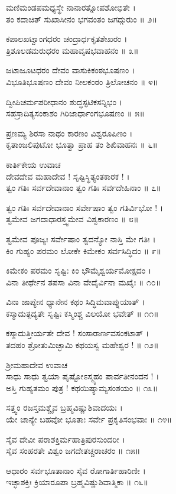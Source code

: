 ಮಣಿಮಂಡಪಮಧ್ಯಸ್ಥೇ ನಾನಾರತ್ನೋಪಶೋಭಿತೇ ।\\
ತಂ ಕದಾಚಿತ್ ಸುಖಾಸೀನಂ ಭಗವಂತಂ ಜಗದ್ಗುರುಂ ॥ ೨॥

ಕಪಾಲಖಟ್ವಾಂಗಧರಂ ಚಂದ್ರಾರ್ಧಕೃತಶೇಖರಂ ।\\
ತ್ರಿಶೂಲಡಮರುಧರಂ ಮಹಾವೃಷಭವಾಹನಂ ॥ ೩॥

ಜಟಾಜೂಟಧರಂ ದೇವಂ ವಾಸುಕಿಕಂಠಭೂಷಣಂ ।\\
ವಿಭೂತಿಭೂಷಣಂ ದೇವಂ ನೀಲಕಂಠಂ ತ್ರಿಲೋಚನಂ ॥ ೪॥

ದ್ವೀಪಿಚರ್ಮಪರೀಧಾನಂ ಶುದ್ಧಸ್ಫಟಿಕಸನ್ನಿಭಂ ।\\
ಸಹಸ್ರಾದಿತ್ಯಸಂಕಾಶಂ ಗಿರಿಜಾರ್ಧಾಂಗಭೂಷಣಂ ॥ ೫॥

ಪ್ರಣಮ್ಯ ಶಿರಸಾ ನಾಥಂ ಕಾರಣಂ ವಿಶ್ವರೂಪಿಣಂ ।\\
ಕೃತಾಂಜಲಿಪುಟೋ ಭೂತ್ವಾ ಪ್ರಾಹ ತಂ ಶಿಖಿವಾಹನಃ ॥ ೬॥

ಕಾರ್ತಿಕೇಯ ಉವಾಚ\\
ದೇವದೇವ ಮಹಾದೇವ ! ಸೃಷ್ಟಿಸ್ಥಿತ್ಯಂತಕಾರಕ ! ।\\
ತ್ವಂ ಗತಿಃ ಸರ್ವದೇವಾನಾಂ ತ್ವಂ ಗತಿಃ ಸರ್ವದೇಹಿನಾಂ ॥ ೭॥

ತ್ವಂ ಗತಿಃ ಸರ್ವದೇವಾನಾಂ ಸರ್ವೇಷಾಂ ತ್ವಂ ಗತಿರ್ವಿಭೋ ! ।\\
ತ್ವಮೇವ ಜಗದಾಧಾರಸ್ತ್ವಮೇವ ವಿಶ್ವಕಾರಣಂ ॥ ೮॥

ತ್ವಮೇವ ಪೂಜ್ಯಃ ಸರ್ವೇಷಾಂ ತ್ವದನ್ಯೋ ನಾಸ್ತಿ ಮೇ ಗತಿಃ ।\\
ಕಿಂ ಗುಹ್ಯಂ ಪರಮಂ ಲೋಕೇ ಕಿಮೇಕಂ ಸರ್ವಸಿದ್ಧಿದಂ ॥ ೯॥

ಕಿಮೇಕಂ ಪರಮಂ ಸೃಷ್ಟಿಃ ಕಿಂ ಭೌಮೈಶ್ವರ್ಯಮೋಕ್ಷದಂ ।\\
ವಿನಾ ತೀರ್ಥೇನ ತಪಸಾ ವಿನಾ ವೇದೈರ್ವಿನಾ ಮಖೈಃ ॥ ೧೦॥

ವಿನಾ ಜಾಪ್ಯೇನ ಧ್ಯಾನೇನ ಕಥಂ ಸಿದ್ಧಿಮವಾಪ್ನುಯಾತ್ ।\\
ಕಸ್ಮಾದುತ್ಪದ್ಯತೇ ಸೃಷ್ಟಿಃ ಕಸ್ಮಿಂಶ್ಚ ವಿಲಯೋ ಭವೇತ್ ॥ ೧೧॥

ಕಸ್ಮಾದುತ್ತೀರ್ಯತೇ ದೇವ ! ಸಂಸಾರಾರ್ಣವಸಂಕಟಾತ್ ।\\
ತದಹಂ ಶ್ರೋತುಮಿಚ್ಛಾಮಿ ಕಥಯಸ್ವ ಮಹೇಶ್ವರ ! ॥ ೧೨॥

ಶ್ರೀಮಹಾದೇವ ಉವಾಚ\\
ಸಾಧು ಸಾಧು ತ್ವಯಾ ಪೃಷ್ಟೋಽಸ್ಮ್ಯಹಂ ಪಾರ್ವತೀನಂದನ ! ।\\
ಅಸ್ತಿ ಗುಹ್ಯತಮಂ ಪುತ್ರ ! ಕಥಯಿಷ್ಯಾಮ್ಯಸಂಶಯಂ ॥ ೧೩॥

ಸತ್ತ್ವಂ ರಜಸ್ತಮಶ್ಚೈವ ಬ್ರಹ್ಮವಿಷ್ಣುಶಿವಾದಯಃ ।\\
ಯೇ ಚಾನ್ಯೇ ಬಹವೋ ಭೂತಾಃ ಸರ್ವೇ ಪ್ರಕೃತಿಸಂಭವಾಃ ॥ ೧೪॥

ಸೈವ ದೇವೀ ಪರಾಶಕ್ತಿರ್ಮಹಾತ್ರಿಪುರಸುಂದರೀ ।\\
ಸೈವ ಸಂಹರತೇ ವಿಶ್ವಂ ಜಗದೇತಚ್ಚರಾಚರಂ ॥ ೧೫॥

ಆಧಾರಂ ಸರ್ವಭೂತಾನಾಂ ಸೈವ ರೋಗಾರ್ತಿಹಾರಿಣೀ ।\\
ಇಚ್ಛಾಶಕ್ತಿಃ ಕ್ರಿಯಾರೂಪಾ ಬ್ರಹ್ಮವಿಷ್ಣುಶಿವಾತ್ಮಿಕಾ ॥ ೧೬॥

